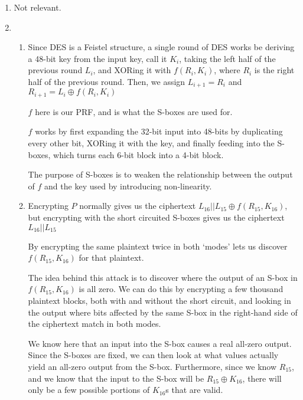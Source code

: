 


\begin{enumerate}[label=(\alph*)]

  \item
    Not relevant.
  \item

    \begin{enumerate}[label=(\roman*)]

      \item

        Since DES is a Feistel structure, a single round of DES works be deriving a 48-bit key from the input key, call it $K_i$, taking the left half of the previous round $L_i$, and XORing it with $f(R_i, K_i)$, where $R_i$ is the right half of the previous round. Then, we assign $L_{i+1} = R_i$ and $R_{i+1} = L_i \oplus f(R_i, K_i)$

        $f$ here is our PRF, and is what the S-boxes are used for.

        $f$ works by first expanding the 32-bit input into 48-bits by duplicating every other bit, XORing it with the key, and finally feeding into the S-boxes, which turns each 6-bit block into a 4-bit block.

        The purpose of S-boxes is to weaken the relationship between the output of $f$ and the key used by introducing non-linearity.

      \item
        Encrypting $P$ normally gives us the ciphertext $L_{16}||L_{15} \oplus f(R_{15}, K_{16})$, but encrypting with the short circuited S-boxes gives us the ciphertext $L_{16}||L_{15}$

        By encrypting the same plaintext twice in both `modes' lets us discover $f(R_{15}, K_{16})$ for that plaintext.

        The idea behind this attack is to discover where the output of an S-box in $f(R_{15}, K_{16})$ is all zero. We can do this by encrypting a few thousand plaintext blocks, both with and without the short circuit, and looking in the output where bits affected by the same S-box in the right-hand side of the ciphertext match in both modes.

        We know here that an input into the S-box causes a real all-zero output. Since the S-boxes are fixed, we can then look at what values actually yield an all-zero output from the S-box. Furthermore, since we know $R_{15}$, and we know that the input to the S-box will be $R_{15} \oplus K_{16}$, there will only be a few possible portions of $K_{16}$s that are valid.


\end{enumerate}
\end{enumerate}

